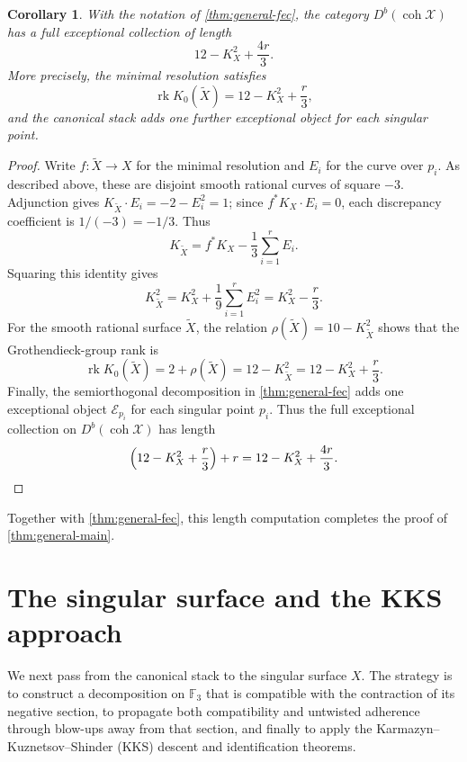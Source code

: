 \documentclass[11pt]{article}
\theoremstyle{plain}
\newtheorem{corollary}[corollary]{Corollary}
\theoremstyle{definition}
\theoremstyle{remark}
\newcommand{\F}{\mathbb F}
\newcommand{\Db}{D^b}
\newcommand{\coh}{\operatorname{coh}}
\newcommand{\rk}{\operatorname{rk}}
\newcommand{\XX}{\mathcal X}
\begin{document}
\begin{corollary}\label{cor:length}
With the notation of \cref{thm:general-fec}, the category \(\Db(\coh \XX)\) has a full exceptional collection of length
\[
12-K_X^2+\frac{4r}{3}.
\]
More precisely, the minimal resolution satisfies
\[
\rk K_0(\widetilde X)=12-K_X^2+\frac r3,
\]
and the canonical stack adds one further exceptional object for each singular point.
\end{corollary}

\begin{proof}
Write \(f:\widetilde X\to X\) for the minimal resolution and \(E_i\)
for the curve over \(p_i\). As described above, these are disjoint smooth
rational curves of square \(-3\). Adjunction gives
\(K_{\widetilde X}\cdot E_i=-2-E_i^2=1\); since
\(f^*K_X\cdot E_i=0\), each discrepancy coefficient is
\(1/(-3)=-1/3\). Thus
\[
K_{\widetilde X}
=
f^*K_X-\frac13\sum_{i=1}^r E_i.
\]
Squaring this identity gives
\[
K_{\widetilde X}^2
=
K_X^2+\frac19\sum_{i=1}^r E_i^2
=
K_X^2-\frac r3.
\]
For the smooth rational surface \(\widetilde X\), the relation \(\rho(\widetilde X)=10-K_{\widetilde X}^2\) shows that the Grothendieck-group rank is
\[
\rk K_0(\widetilde X)=2+\rho(\widetilde X)
=
12-K_{\widetilde X}^2
=
12-K_X^2+\frac r3.
\]
Finally, the semiorthogonal decomposition in \cref{thm:general-fec} adds one exceptional object \(\mathcal E_{p_i}\) for each singular point \(p_i\). Thus the full exceptional collection on \(\Db(\coh \XX)\) has length
\[
\left(12-K_X^2+\frac r3\right)+r
=
12-K_X^2+\frac{4r}{3}.\qedhere
\]
\end{proof}

Together with \cref{thm:general-fec}, this length computation completes the
proof of \cref{thm:general-main}.

\section{The singular surface and the KKS approach}
\label{sec:kks}

We next pass from the canonical stack to the singular surface \(X\).
The strategy is to construct a decomposition on \(\F_3\) that is compatible
with the contraction of its negative section, to propagate both compatibility
and untwisted adherence through blow-ups away from that section, and finally
to apply the Karmazyn--Kuznetsov--Shinder (KKS) descent and identification
theorems.
\end{document}
